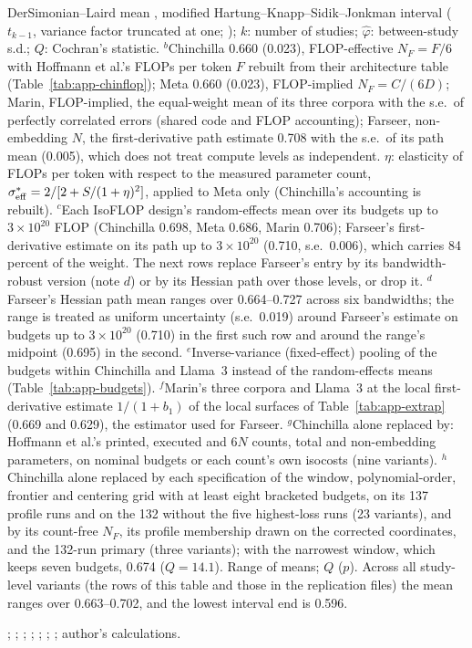 \begin{table}[tp]
\begin{tablenotes}
DerSimonian--Laird mean \citep{dersimonian1986meta}, modified Hartung--Knapp--Sidik--Jonkman interval ($t_{k-1}$, variance factor truncated at one; \citealt{hartung2001tests,sidik2002simple,knapp2003improved,roever2015hartung}); $k$: number of studies; $\hat\varphi$: between-study s.d.; $Q$: Cochran's statistic. $^{b}$Chinchilla 0.660 (0.023), FLOP-effective $N_F=F/6$ with Hoffmann et al.'s FLOPs per token $F$ rebuilt from their architecture table (Table~\ref{tab:app-chinflop}); Meta 0.660 (0.023), FLOP-implied $N_F=C/(6D)$; Marin, FLOP-implied, the equal-weight mean of its three corpora with the s.e.\ of perfectly correlated errors (shared code and FLOP accounting); Farseer, non-embedding $N$, the first-derivative path estimate 0.708 with the s.e.\ of its path mean (0.005), which does not treat compute levels as independent. $\eta$: elasticity of FLOPs per token with respect to the measured parameter count, $\sigma^*_{\rm eff}=2/[2+S/(1+\eta)^2]$, applied to Meta only (Chinchilla's accounting is rebuilt). $^{c}$Each IsoFLOP design's random-effects mean over its budgets up to $3\times10^{20}$ FLOP (Chinchilla 0.698, Meta 0.686, Marin 0.706); Farseer's first-derivative estimate on its path up to $3\times10^{20}$ (0.710, s.e.\ 0.006), which carries 84 percent of the weight. The next rows replace Farseer's entry by its bandwidth-robust version (note $d$) or by its Hessian path over those levels, or drop it. $^{d}$Farseer's Hessian path mean ranges over 0.664--0.727 across six bandwidths; the range is treated as uniform uncertainty (s.e.\ 0.019) around Farseer's estimate on budgets up to $3\times10^{20}$ (0.710) in the first such row and around the range's midpoint (0.695) in the second. $^{e}$Inverse-variance (fixed-effect) pooling of the budgets within Chinchilla and Llama~3 instead of the random-effects means (Table~\ref{tab:app-budgets}). $^{f}$Marin's three corpora and Llama~3 at the local first-derivative estimate $1/(1+b_1)$ of the local surfaces of Table~\ref{tab:app-extrap} (0.669 and 0.629), the estimator used for Farseer. $^{g}$Chinchilla alone replaced by: Hoffmann et al.'s printed, executed and $6N$ counts, total and non-embedding parameters, on nominal budgets or each count's own isocosts (nine variants). $^{h}$Chinchilla alone replaced by each specification of the window, polynomial-order, frontier and centering grid with at least eight bracketed budgets, on its 137 profile runs and on the 132 without the five highest-loss runs (23 variants), and by its count-free $N_F$, its profile membership drawn on the corrected coordinates, and the 132-run primary (three variants); with the narrowest window, which keeps seven budgets, 0.674 ($Q=14.1$). Range of means; $Q$ ($p$). Across all study-level variants (the rows of this table and those in the replication files) the mean ranges over 0.663--0.702, and the lowest interval end is 0.596.
\end{tablenotes}

\begin{tablenotes}[Source]
\citet{hoffmann2022training}; \citet{besiroglu2024chinchilla}; \citet{grattafiori2024llama}; \citet{czech2026llama3isoflop}; \citet{marin2026ladders}; \citet{porian2024resolving}; \citet{li2025predictableb}; author's calculations.
\end{tablenotes}
\end{table}
